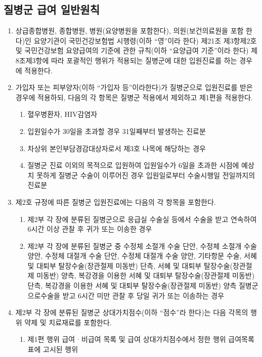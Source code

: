 \subsection{질병군 급여 일반원칙}
\begin{enumerate}[1.]\tightlist
\item 상급종합병원, 종합병원, 병원(요양병원을 포함한다), 의원(보건의료원을 포함 한다)인 요양기관이 국민건강보험법 시행령(이하 “영”이라 한다) 제21조 제3항제2호 및 국민건강보험 요양급여의 기준에 관한 규칙(이하 “요양급여 기준”이라 한다) 제8조제3항에 따라 포괄적인 행위가 적용되는 질병군에 대한 입원진료를 하는 경우에 적용한다.
\item 가입자 또는 피부양자(이하 “가입자 등”이라한다)가 질병군으로 입원진료를 받은 경우에 적용하되, 다음의 각 항목은 질병군 적용에서 제외하고 제1편을 적용한다.
	\begin{enumerate}[가.]\tightlist
	\item 혈우병환자, HIV감염자
	\item 입원일수가 30일을 초과할 경우 31일째부터 발생하는 진료분
	\item 차상위 본인부담경감대상자로서 제3호 나목에 해당하는 경우
	\item 질병군 진료 이외의 목적으로 입원하여 입원일수가 6일을 초과한 시점에 예상치 못하게 질병군 수술이 이루어진 경우 입원일로부터 수술시행일 전일까지의 진료분
	\end{enumerate}
\item 제2호 규정에 따른 질병군 입원진료에는 다음의 각 항목을 포함한다.
	\begin{enumerate}[가.]\tightlist
	\item 제2부 각 장에 분류된 질병군으로 응급실\cntrdot{} 수술실 등에서 수술을 받고 연속하여 6시간 이상 관찰 후 귀가 또는 이송한 경우
	\item 제2부 각 장에 분류된 질병군 중 수정체 소절개 수술 단안, 수정체 소절개 수술 양안, 수정체 대절개 수술 단안, 수정체 대절개 수술 양안, 기타항문 수술, 서혜 및 대퇴부 탈장수술(장관절제 미동반) 단측, 서혜 및 대퇴부 탈장수술(장관절제 미동반) 양측, 복강경을 이용한 서혜 및 대퇴부 탈장수술(장관절제 미동반) 단측, 복강경을 이용한 서혜 및 대퇴부 탈장수술(장관절제 미동반) 양측 질병군으로수술을 받고 6시간 미만 관찰 후 당일 귀가 또는 이송하는 경우
	\end{enumerate}
\item 제2부 각 장에 분류된 질병군 상대가치점수(이하 “점수”라 한다)는 다음 각목의 행위\cntrdot{} 약제 및 치료재료를 포함한다.
	\begin{enumerate}[가.]\tightlist
	\item 제1편 행위 급여ᆞ비급여 목록 및 급여 상대가치점수에서 정한 행위 급여목록표에 고시된 행위

\end{enumerate}
\end{enumerate}
